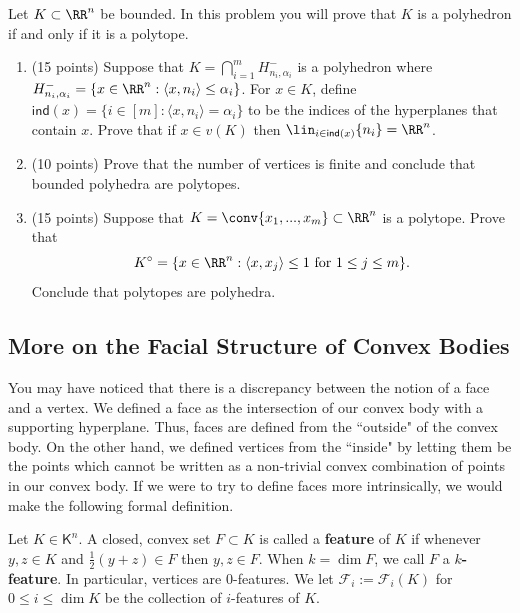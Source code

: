 \documentclass[11pt]{article}
\begin{document}
\begin{prob} [40 points]\label{problem-weyl-minkowski}
    Let $K \subset \RR^n$ be bounded. In this problem you will prove that $K$ is a polyhedron if and only if it is a polytope. 
    \begin{enumerate}[label = (\alph*)]
        \item (15 points) Suppose that $K = \bigcap_{i = 1}^m H_{n_i, \alpha_i}^-$ is a polyhedron where $H_{n_i, \alpha_i}^- = \{x \in \RR^n : \langle x, n_i \rangle \leq \alpha_i\}$. For $x \in K$, define $\mathsf{ind}(x) = \{i \in [m] : \langle x, n_i \rangle = \alpha_i\}$ to be the indices of the hyperplanes that contain $x$. Prove that if $x \in v(K)$ then $\lin_{i \in \mathsf{ind}(x)} \{n_i\} = \RR^n$. 
        
        \item (10 points) Prove that the number of vertices is finite and conclude that bounded polyhedra are polytopes. 
        
        \item (15 points) Suppose that $K = \conv \{x_1, ..., x_m\} \subset \RR^n$ is a polytope. Prove that
        \[
            K^\circ = \{x \in \RR^n : \langle x, x_j \rangle \leq 1 \text{ for } 1 \leq j \leq m\}.
        \]
        Conclude that polytopes are polyhedra.
    \end{enumerate}
\end{prob}

\subsection{More on the Facial Structure of Convex Bodies}

You may have noticed that there is a discrepancy between the notion of a face and a vertex. We defined a face as the intersection of our convex body with a supporting hyperplane. Thus, faces are defined from the ``outside" of the convex body. On the other hand, we defined vertices from the ``inside" by letting them be the points which cannot be written as a non-trivial convex combination of points in our convex body. If we were to try to define faces more intrinsically, we would make the following formal definition. 

\begin{defn}
    Let $K \in \mathsf{K}^n$. A closed, convex set $F \subset K$ is called a \textbf{feature} of $K$ if whenever $y, z \in K$ and $\frac{1}{2}(y + z) \in F$ then $y, z \in F$. When $k = \dim F$, we call $F$ a \textbf{$k$-feature}. In particular, vertices are $0$-features. We let $\mathcal{F}_i := \mathcal{F}_i(K)$ for $0 \leq i \leq \dim K$ be the collection of $i$-features of $K$. 
\end{defn}
\end{document}
